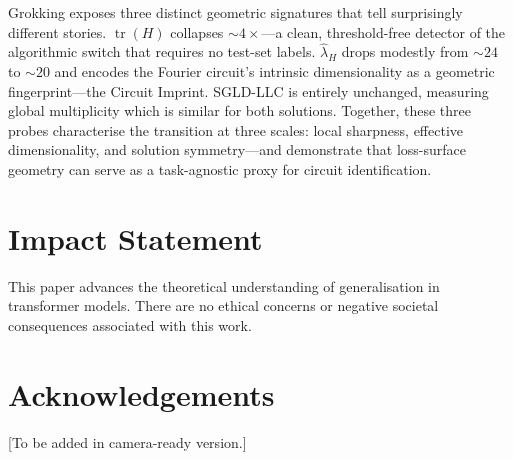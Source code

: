 \documentclass{article}
\begin{document}
Grokking exposes three distinct geometric signatures that tell surprisingly
different stories.  $\operatorname{tr}(H)$ collapses $\sim\!4\times$—a clean,
threshold-free detector of the algorithmic switch that requires no test-set
labels.  $\hat\lambda_H$ drops modestly from $\sim\!24$ to $\sim\!20$ and
encodes the Fourier circuit's intrinsic dimensionality as a geometric
fingerprint—the Circuit Imprint.  SGLD-LLC is entirely unchanged, measuring
global multiplicity which is similar for both solutions.
Together, these three probes characterise the transition at three scales:
local sharpness, effective dimensionality, and solution symmetry—and
demonstrate that loss-surface geometry can serve as a task-agnostic proxy
for circuit identification.

\section*{Impact Statement}
This paper advances the theoretical understanding of generalisation in
transformer models.  There are no ethical concerns or negative societal
consequences associated with this work.

\section*{Acknowledgements}
[To be added in camera-ready version.]



\end{document}
